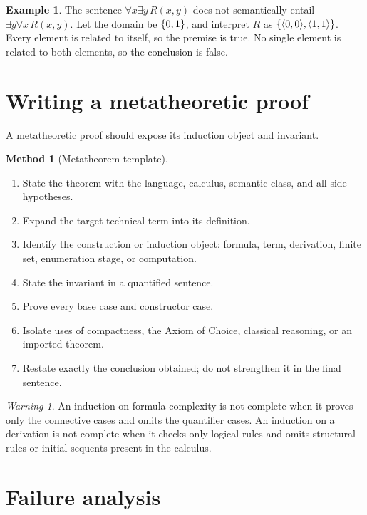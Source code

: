 \documentclass[11pt,oneside,openany]{book}
\theoremstyle{definition}
\newtheorem{example}[definition]{Example}
\newtheorem{method}[definition]{Method}
\theoremstyle{plain}
\theoremstyle{remark}
\newtheorem{warning}[definition]{Warning}
\DeclarePairedDelimiter{\set}{\lbrace}{\rbrace}
\DeclarePairedDelimiter{\angles}{\langle}{\rangle}
\newcommand{\tuple}[1]{\angles{#1}}
\begin{document}
\begin{example}
The sentence \(\forall x\exists y\,R(x,y)\) does not semantically entail
\(\exists y\forall x\,R(x,y)\).  Let the domain be \(\set{0,1}\), and
interpret \(R\) as \(\set{\tuple{0,0},\tuple{1,1}}\).  Every element is
related to itself, so the premise is true.  No single element is related to
both elements, so the conclusion is false.
\end{example}

\section{Writing a metatheoretic proof}
\label{sec:formal-practice-04}

A metatheoretic proof should expose its induction object and invariant.

\begin{method}[Metatheorem template]
\begin{enumerate}
  \item State the theorem with the language, calculus, semantic class, and all
        side hypotheses.
  \item Expand the target technical term into its definition.
  \item Identify the construction or induction object: formula, term,
        derivation, finite set, enumeration stage, or computation.
  \item State the invariant in a quantified sentence.
  \item Prove every base case and constructor case.
  \item Isolate uses of compactness, the Axiom of Choice, classical reasoning, or an imported
        theorem.
  \item Restate exactly the conclusion obtained; do not strengthen it in the
        final sentence.
\end{enumerate}
\end{method}

\begin{warning}
An induction on formula complexity is not complete when it proves only the
connective cases and omits the quantifier cases.  An induction on a derivation
is not complete when it checks only logical rules and omits structural rules or
initial sequents present in the calculus.
\end{warning}

\section{Failure analysis}
\label{sec:formal-practice-05}
\end{document}
